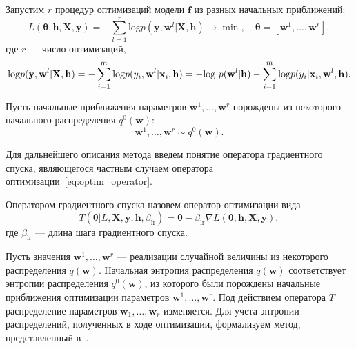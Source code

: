 Запустим $r$ процедур оптимизаций модели $\mathbf{f}$ из разных начальных приближений:
\[
	L( \boldsymbol{\theta}, \mathbf{h}, \mathbf{X}, \mathbf{y}) = -\sum_{l=1}^r \text{log}p(\mathbf{y}, \mathbf{w}^l|\mathbf{X}, \mathbf{h})  \to \min, \quad \boldsymbol{\theta} = [\mathbf{w}^1, \dots, \mathbf{w}^r],
\] 
где $r$ --- число оптимизаций,
\begin{equation}
\label{eq:loss_func}
\text{log}p(\mathbf{y}, \mathbf{w}^l|\mathbf{X}, \mathbf{h}) = -\sum_{i=1}^m \textnormal{log}p({y}_i, \mathbf{w}^l |\mathbf{x}_i, \mathbf{h}) = -\textnormal{log}~p(\mathbf{w}^l|\mathbf{h}) - \sum_{i=1}^m \textnormal{log}p({y}_i |\mathbf{x}_i, \mathbf{w}^l, \mathbf{h}).
\end{equation}

Пусть начальные приближения параметров $\mathbf{w}^1, \dots, \mathbf{w}^r$ порождены из некоторого начального распределения $q^0(\mathbf{w})$:
\[ 
	\mathbf{w}^1, \dots, \mathbf{w}^r \sim q^0(\mathbf{w}). 
\]




Для дальнейшего описания метода введем понятие оператора градиентного спуска, являющегося частным случаем оператора оптимизации~\eqref{eq:optim_operator}.
\begin{defin}
Оператором градиентного спуска назовем оператор оптимизации вида
\begin{equation}
\label{eq:sgd}
	T( \boldsymbol{\theta}| L,\mathbf{X},  \mathbf{y},  \mathbf{h}, {\beta_{\text{lr}}}) = \boldsymbol{\theta} - \beta_{\text{lr}} \nabla L( \boldsymbol{\theta}, \mathbf{h}, \mathbf{X}, \mathbf{y}), 
\end{equation}
где  $\beta_{\text{lr}}$ --- длина шага градиентного спуска.
\end{defin}

Пусть значения $\mathbf{w}^1, \dots, \mathbf{w}^r$  --- реализации случайной величины из некоторого распределения $q(\mathbf{w})$. Начальная энтропия распределения $q(\mathbf{w})$ соответствует энтропии распределения $q^0(\mathbf{w})$, из которого были порождены начальные приближения оптимизации параметров $\mathbf{w}^1, \dots, \mathbf{w}^r$. Под действием оператора $T$ распределение параметров $\mathbf{w}_1, \dots, \mathbf{w}_r$ изменяется. Для учета энтропии распределений, полученных в ходе оптимизации,
{ формализуем метод,  представленный в~\cite{early}. }

